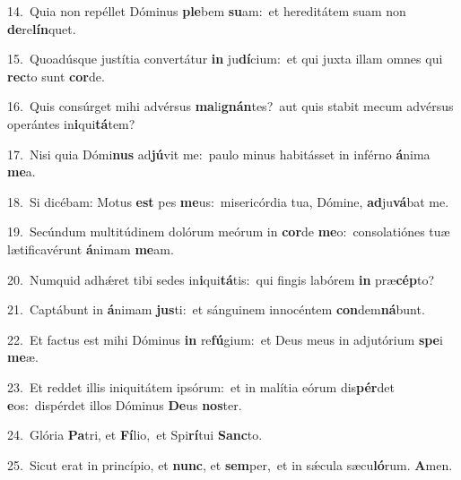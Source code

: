 {\numbfont\textcolor{\numbcolor}{14.}}~Quia non repéllet Dóminus \textbf{ple}\-bem \textbf{su}\-am:~\star et hereditátem suam non \textbf{de}\-re\-\textbf{lín}\-quet.\par
{\numbfont\textcolor{\numbcolor}{15.}}~Quoadúsque justítia convertátur \textbf{in} ju\-\textbf{dí}\-cium:~\star et qui juxta illam omnes qui \textbf{rec}\-to sunt \textbf{cor}\-de.\par
{\numbfont\textcolor{\numbcolor}{16.}}~Quis consúrget mihi advérsus \textbf{ma}\-li\-\textbf{gnán}\-tes?~\star aut quis stabit mecum advérsus operántes in\-\textbf{i}\-qui\-\textbf{tá}\-tem?\par
{\numbfont\textcolor{\numbcolor}{17.}}~Nisi quia Dómi\textbf{nus} ad\-\textbf{jú}\-vit me:~\star paulo minus habitásset in inférno \textbf{á}\-nima \textbf{me}\-a.\par
{\numbfont\textcolor{\numbcolor}{18.}}~Si dicébam: Motus \textbf{est} pes \textbf{me}\-us:~\star misericórdia tua, Dómine, \textbf{ad}\-ju\-\textbf{vá}\-bat me.\par
{\numbfont\textcolor{\numbcolor}{19.}}~Secúndum multitúdinem dolórum meórum in \textbf{cor}\-de \textbf{me}\-o:~\star consolatiónes tuæ lætificavérunt \textbf{á}\-nimam \textbf{me}\-am.\par
{\numbfont\textcolor{\numbcolor}{20.}}~Numquid adhǽret tibi sedes in\-\textbf{i}\-qui\-\textbf{tá}\-tis:~\star qui fingis labórem \textbf{in} præ\-\textbf{cép}\-to?\par
{\numbfont\textcolor{\numbcolor}{21.}}~Captábunt in \textbf{á}\-nimam \textbf{jus}\-ti:~\star et sánguinem innocéntem \textbf{con}\-dem\-\textbf{ná}\-bunt.\par
{\numbfont\textcolor{\numbcolor}{22.}}~Et factus est mihi Dóminus \textbf{in} re\-\textbf{fú}\-gium:~\star et Deus meus in adjutórium \textbf{spe}\-i \textbf{me}\-æ.\par
{\numbfont\textcolor{\numbcolor}{23.}}~Et reddet illis iniquitátem ipsórum:~\dagger et in malítia eórum dis\-\textbf{pér}\-det \textbf{e}\-os:~\star dispérdet illos Dóminus \textbf{De}\-us \textbf{nos}\-ter.\par
{\numbfont\textcolor{\numbcolor}{24.}}~Glória \textbf{Pa}\-tri, et \textbf{Fí}\-lio,~\star et Spi\-\textbf{rí}\-tui \textbf{Sanc}\-to.\par
{\numbfont\textcolor{\numbcolor}{25.}}~Sicut erat in princípio, et \textbf{nunc}\-, et \textbf{sem}\-per,~\star et in sǽcula sæcu\-\textbf{ló}\-rum. \textbf{A}\-men.\par
